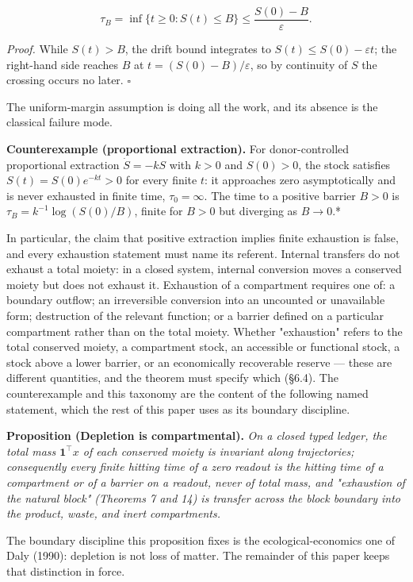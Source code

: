 \documentclass[11pt]{article}
\begin{document}
$$\tau_B = \inf\{ t \ge 0 : S(t) \le B \} \le \frac{S(0) - B}{\varepsilon}.$$



\emph{Proof.} While \(S(t) > B\), the drift bound integrates to \(S(t) \le S(0) - \varepsilon t\); the right-hand side reaches \(B\) at \(t = (S(0) - B)/\varepsilon\), so by continuity of \(S\) the crossing occurs no later. \(\square\)

The uniform-margin assumption is doing all the work, and its absence is the classical failure mode.

\textbf{Counterexample (proportional extraction).} For donor-controlled proportional extraction \(\dot S=-kS\) with \(k>0\) and \(S(0)>0\), the stock satisfies \(S(t)=S(0)e^{-kt}>0\) for every finite \(t\): it approaches zero asymptotically and is never exhausted in finite time, \(\tau_0=\infty\). The time to a positive barrier \(B > 0\) is \(\tau_B = k^{-1}\log(S(0)/B)\), finite for \(B > 0\) but diverging as \(B \to 0\).*

In particular, the claim that positive extraction implies finite exhaustion is false, and every exhaustion statement must name its referent. Internal transfers do not exhaust a total moiety: in a closed system, internal conversion moves a conserved moiety but does not exhaust it. Exhaustion of a compartment requires one of: a boundary outflow; an irreversible conversion into an uncounted or unavailable form; destruction of the relevant function; or a barrier defined on a particular compartment rather than on the total moiety. Whether "exhaustion" refers to the total conserved moiety, a compartment stock, an accessible or functional stock, a stock above a lower barrier, or an economically recoverable reserve --- these are different quantities, and the theorem must specify which (\S6.4). The counterexample and this taxonomy are the content of the following named statement, which the rest of this paper uses as its boundary discipline.

\textbf{Proposition (Depletion is compartmental).} \emph{On a closed typed ledger, the total mass \(\mathbf{1}^\top x\) of each conserved moiety is invariant along trajectories; consequently every finite hitting time of a zero readout is the hitting time of a compartment or of a barrier on a readout, never of total mass, and "exhaustion of the natural block" (Theorems 7 and 14) is transfer across the block boundary into the product, waste, and inert compartments.}

The boundary discipline this proposition fixes is the ecological-economics one of Daly (1990): depletion is not loss of matter. The remainder of this paper keeps that distinction in force.
\end{document}
